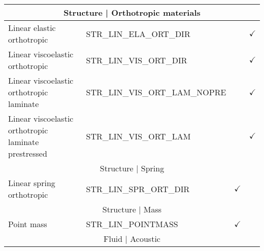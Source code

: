 \begin{longtable}{p{6cm}p{6cm}cc}
    \multicolumn{4}{c}{Structure |   Orthotropic materials}                                                                                                                                                                \\ \hline
    Linear elastic orthotropic                                                                                 & STR\_LIN\_ELA\_ORT\_DIR           &                                 & $\checkmark$                        \\
    Linear viscoelastic orthotropic                                                                            & STR\_LIN\_VIS\_ORT\_DIR           &                                 & $\checkmark$                        \\
    Linear viscoelastic orthotropic laminate                                                                   & STR\_LIN\_VIS\_ORT\_LAM\_NOPRE    &                                 & $\checkmark$                        \\
    Linear viscoelastic orthotropic laminate   prestressed                                                     & STR\_LIN\_VIS\_ORT\_LAM           &                                 & $\checkmark$                        \\\hline
    \multicolumn{4}{c}{Structure | Spring}                                                                                                                                                                                 \\\hline
    Linear spring orthotropic                                                                                  & STR\_LIN\_SPR\_ORT\_DIR           & $\checkmark$                    &                                     \\\hline
    \multicolumn{4}{c}{Structure | Mass}                                                                                                                                                                                   \\\hline
    Point mass                                                                                                 & STR\_LIN\_POINTMASS               & $\checkmark$                    &                                     \\\hline
    \multicolumn{4}{c}{Fluid | Acoustic}                                                                                                                                                                                   \\\hline

\end{longtable}
